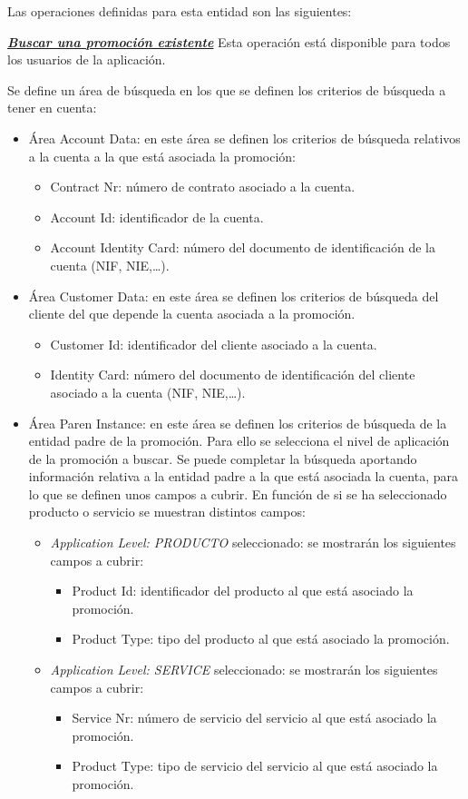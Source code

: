 Las operaciones definidas para esta entidad son las siguientes:


\underline{\textsl{\textbf{Buscar una promoción existente}}}\newline
Esta operación está disponible para todos los usuarios de la aplicación.

Se define un área de búsqueda en los que se definen los criterios de búsqueda a tener en cuenta:
\begin{itemize}
	\item Área Account Data: en este área se definen los criterios de búsqueda relativos a la cuenta a la que está asociada la promoción:
		\begin{itemize}
			\item Contract Nr: número de contrato asociado a la cuenta.
			\item Account Id: identificador de la cuenta.
			\item Account Identity Card: número del documento de identificación de la cuenta (NIF, NIE,\dots).
		\end{itemize}
	\item Área Customer Data: en este área se definen los criterios de búsqueda del cliente del que depende la cuenta asociada a la promoción.
		\begin{itemize}
			\item Customer Id: identificador del cliente asociado a la cuenta.
			\item Identity Card: número del documento de identificación del cliente asociado a la cuenta (NIF, NIE,\dots).
		\end{itemize}
	\item Área Paren Instance: en este área se definen los criterios de búsqueda de la entidad padre de la promoción. Para ello se selecciona el nivel de aplicación de la promoción a buscar. Se puede completar la búsqueda aportando información relativa a la entidad padre a la que está asociada la cuenta, para lo que se definen unos campos a cubrir. En función de si se ha seleccionado producto o servicio se muestran distintos campos:
	\begin{itemize}
 		\item \emph{Application Level: PRODUCTO} seleccionado: se mostrarán los siguientes campos a cubrir:
			\begin{itemize}
				\item Product Id: identificador del producto al que está asociado la promoción.
				\item Product Type: tipo del producto al que está asociado la promoción.
			\end{itemize}
		\item \emph{Application Level: SERVICE} seleccionado:  se mostrarán los siguientes campos a cubrir:
		\begin{itemize}
			\item Service Nr: número de servicio del servicio al que está asociado la promoción.
			\item Product Type: tipo de servicio del servicio al que está asociado la promoción.
		\end{itemize}
		

\end{itemize}
\end{itemize}
